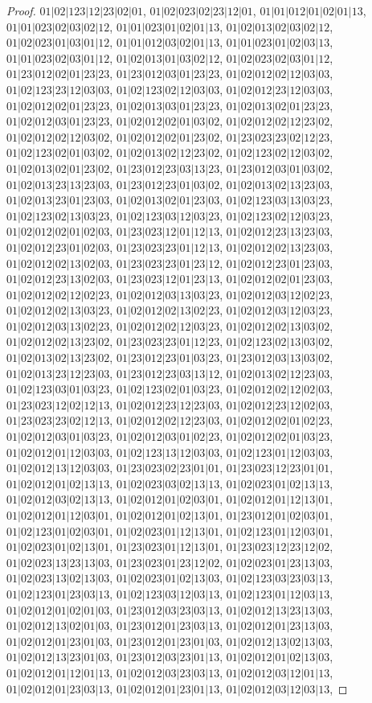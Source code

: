 \documentclass[12pt]{article}
\theoremstyle{plain}
\theoremstyle{definition}
\theoremstyle{remark}
\begin{document}
\begin{proof}
$01|02|123|12|23|02|01$, $01|02|023|02|23|12|01$, $01|01|012|01|02|01|13$, $01|01|023|02|03|02|12$, $01|01|023|01|02|01|13$, $01|02|013|02|03|02|12$, $01|02|023|01|03|01|12$, $01|01|012|03|02|01|13$, $01|01|023|01|02|03|13$, $01|01|023|02|03|01|12$, $01|02|013|01|03|02|12$, $01|02|023|02|03|01|12$, $01|23|012|02|01|23|23$, $01|23|012|03|01|23|23$, $01|02|012|02|12|03|03$, $01|02|123|23|12|03|03$, $01|02|123|02|12|03|03$, $01|02|012|23|12|03|03$, $01|02|012|02|01|23|23$, $01|02|013|03|01|23|23$, $01|02|013|02|01|23|23$, $01|02|012|03|01|23|23$, $01|02|012|02|01|03|02$, $01|02|012|02|12|23|02$, $01|02|012|02|12|03|02$, $01|02|012|02|01|23|02$, $01|23|023|23|02|12|23$, $01|02|123|02|01|03|02$, $01|02|013|02|12|23|02$, $01|02|123|02|12|03|02$, $01|02|013|02|01|23|02$, $01|23|012|23|03|13|23$, $01|23|012|03|01|03|02$, $01|02|013|23|13|23|03$, $01|23|012|23|01|03|02$, $01|02|013|02|13|23|03$, $01|02|013|23|01|23|03$, $01|02|013|02|01|23|03$, $01|02|123|03|13|03|23$, $01|02|123|02|13|03|23$, $01|02|123|03|12|03|23$, $01|02|123|02|12|03|23$, $01|02|012|02|01|02|03$, $01|23|023|12|01|12|13$, $01|02|012|23|13|23|03$, $01|02|012|23|01|02|03$, $01|23|023|23|01|12|13$, $01|02|012|02|13|23|03$, $01|02|012|02|13|02|03$, $01|23|023|23|01|23|12$, $01|02|012|23|01|23|03$, $01|02|012|23|13|02|03$, $01|23|023|12|01|23|13$, $01|02|012|02|01|23|03$, $01|02|012|02|12|02|23$, $01|02|012|03|13|03|23$, $01|02|012|03|12|02|23$, $01|02|012|02|13|03|23$, $01|02|012|02|13|02|23$, $01|02|012|03|12|03|23$, $01|02|012|03|13|02|23$, $01|02|012|02|12|03|23$, $01|02|012|02|13|03|02$, $01|02|012|02|13|23|02$, $01|23|023|23|01|12|23$, $01|02|123|02|13|03|02$, $01|02|013|02|13|23|02$, $01|23|012|23|01|03|23$, $01|23|012|03|13|03|02$, $01|02|013|23|12|23|03$, $01|23|012|23|03|13|12$, $01|02|013|02|12|23|03$, $01|02|123|03|01|03|23$, $01|02|123|02|01|03|23$, $01|02|012|02|12|02|03$, $01|23|023|12|02|12|13$, $01|02|012|23|12|23|03$, $01|02|012|23|12|02|03$, $01|23|023|23|02|12|13$, $01|02|012|02|12|23|03$, $01|02|012|02|01|02|23$, $01|02|012|03|01|03|23$, $01|02|012|03|01|02|23$, $01|02|012|02|01|03|23$, $01|02|012|01|12|03|03$, $01|02|123|13|12|03|03$, $01|02|123|01|12|03|03$, $01|02|012|13|12|03|03$, $01|23|023|02|23|01|01$, $01|23|023|12|23|01|01$, $01|02|012|01|02|13|13$, $01|02|023|03|02|13|13$, $01|02|023|01|02|13|13$, $01|02|012|03|02|13|13$, $01|02|012|01|02|03|01$, $01|02|012|01|12|13|01$, $01|02|012|01|12|03|01$, $01|02|012|01|02|13|01$, $01|23|012|01|02|03|01$, $01|02|123|01|02|03|01$, $01|02|023|01|12|13|01$, $01|02|123|01|12|03|01$, $01|02|023|01|02|13|01$, $01|23|023|01|12|13|01$, $01|23|023|12|23|12|02$, $01|02|023|13|23|13|03$, $01|23|023|01|23|12|02$, $01|02|023|01|23|13|03$, $01|02|023|13|02|13|03$, $01|02|023|01|02|13|03$, $01|02|123|03|23|03|13$, $01|02|123|01|23|03|13$, $01|02|123|03|12|03|13$, $01|02|123|01|12|03|13$, $01|02|012|01|02|01|03$, $01|23|012|03|23|03|13$, $01|02|012|13|23|13|03$, $01|02|012|13|02|01|03$, $01|23|012|01|23|03|13$, $01|02|012|01|23|13|03$, $01|02|012|01|23|01|03$, $01|23|012|01|23|01|03$, $01|02|012|13|02|13|03$, $01|02|012|13|23|01|03$, $01|23|012|03|23|01|13$, $01|02|012|01|02|13|03$, $01|02|012|01|12|01|13$, $01|02|012|03|23|03|13$, $01|02|012|03|12|01|13$, $01|02|012|01|23|03|13$, $01|02|012|01|23|01|13$, $01|02|012|03|12|03|13$, 
\end{proof}
\end{document}

